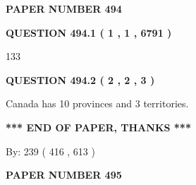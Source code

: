 \documentclass[12pt]{article}
\begin{document}
   
   
   
 {\textbf{ \Large{ PAPER NUMBER  494  }}}
   
   
\vspace{0.2in}
   
   
   
   
   
   
 \vspace{0.2in}
 
 
 
 
   
   
  
\vspace{0.2in}
  
{\textbf{\Large{QUESTION
494.1 
 ( 1 , 1 , 6791 )
}}}
  
  
 
 
\noindent{}

133
 
 
  
\vspace{0.2in}
  
{\textbf{\Large{QUESTION
494.2 
 ( 2 , 2 , 3 )
}}}
  
  
 
 
\noindent{}
 
 
Canada has 10  provinces and 3 territories.
 
 
 
 
   
   
 \vspace{0.2in}
 
   
   
   
   
\vspace{1.0in} 
{\textbf{\large{ *** END OF PAPER, THANKS *** }}} 
   
   
\hspace{1.0in} By: 
 239 ( 416 ,  613 )
   
   
   
   
\newpage 
\setcounter{page}{ 
   495001 } 
   
   
   
   
 {\textbf{ \Large{ PAPER NUMBER  495  }}}
   
   
\vspace{0.2in}
   
\end{document}
